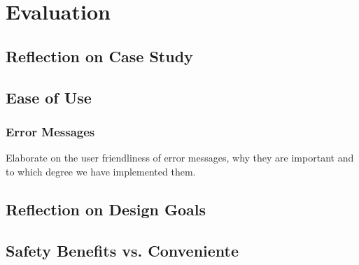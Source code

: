 \chapter{Evaluation}

\section{Reflection on Case Study} %
\label{sec:reflection_on_case_study}


\section{Ease of Use} %
\label{sec:ease_of_use}

	\subsection{Error Messages} %
	\label{sub:error_messages}
		Elaborate on the user friendliness of error messages, why they are important
		and to which degree we have implemented them.	


\section{Reflection on Design Goals} %
\label{sec:reflection_on_design_goals}


\section{Safety Benefits vs. Conveniente} %
\label{sec:safety_benefits_vs_conveniente}

